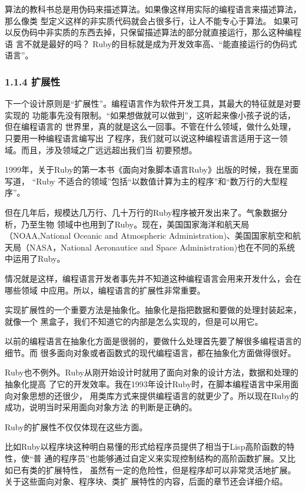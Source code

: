 \documentclass[11pt]{ctexart}
\begin{document}
算法的教科书总是用伪码来描述算法。如果像这样用实际的编程语言来描述算法，那么像类
型定义这样的非实质代码就会占很多行，让人不能专心于算法。
如果可以反伪码中非实质的东西去掉，只保留描述算法的部分就直接运行，那么这种编程语
言不就是最好的吗？ Ruby的目标就是成为开发效率高、“能直接运行的伪码式语言”。

\subsubsection{1.1.4 扩展性}
\label{sec:orgheadline4}

下一个设计原则是“扩展性”。编程语言作为软件开发工具，其最大的特征就是对要实现的
功能事先没有限制。“如果想做就可以做到”，这听起来像小孩子说的话，但在编程语言的
世界里，真的就是这么一回事。不管在什么领域，做什么处理，只要用一种编程语言编写出
了程序，我们就可以说这种编程语言适用于这一领域。而且，涉及领域之广远远超出我们当
初要预想。

1999年，关于Ruby的第一本书《面向对象脚本语言Ruby》出版的时候，我在里面写道，
“Ruby 不适合的领域”包括“以数值计算为主的程序”和“数万行的大型程序”。

但在几年后，规模达几万行、几十万行的Ruby程序被开发出来了。气象数据分析，乃至生物
领域中也用到了Ruby。现在，美国国家海洋和航天局（NOAA,National Oceanic and
Atmospheric Administration)、美国国家航空和航天局（NASA，National Aeronautice
and Space Administration)也在不同的系统中运用了Ruby。

情况就是这样，编程语言开发者事先并不知道这种编程语言会用来开发什么，会在哪些领域
中应用。所以，编程语言的扩展性非常重要。

实现扩展性的一个重要方法是抽象化。抽象化是指把数据和要做的处理封装起来，就像一个
黑盒子，我们不知道它的内部是怎么实现的，但是可以用它。

以前的编程语言在抽象化方面是很弱的，要做什么处理首先要了解很多编程语言的细节。而
很多面向对象或者函数式的现代编程语言，都在抽象化方面做得很好。

Ruby也不例外。Ruby从刚开始设计时就用了面向对象的设计方法，数据和处理的抽象化提高
了它的开发效率。我在1993年设计Ruby时，在脚本编程语言中采用面向对象思想的还很少，
用类库方式来提供编程语言的就更少了。所以现在Ruby的成功，说明当时采用面向对象方法
的判断是正确的。

Ruby的扩展性不仅仅体现在这些方面。

比如Ruby以程序块这种明白易懂的形式给程序员提供了相当于Lisp高阶函数的特性，使“普
通的程序员”也能够通过自定义来实现控制结构的高阶函数扩展。又比如已有类的扩展特性，
虽然有一定的危险性，但是程序却可以非常灵活地扩展。关于这些面向对象、程序块、类扩
展特性的内容，后面的章节还会详细介绍。
\end{document}
